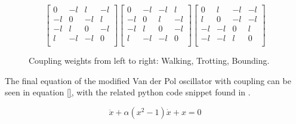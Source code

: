 \begin{figure}
\[
\begin{bmatrix}
0   & -l & l  & -l\\
-l   & 0 & -l  & l\\
-l   & l & 0  & -l\\
l   & -l & -l  & 0\\
\end{bmatrix}
\begin{bmatrix}
0   &  -l & -l  & l\\
-l   & 0 & l  &  -l\\
-l   & l & 0  & -l\\
l   & -l & -l  & 0\\
\end{bmatrix}
\begin{bmatrix}
0   & l & -l  & -l\\
l  & 0 & -l & -l\\
-l   & -l & 0  & l\\
-l  & -l & l  & 0\\
\end{bmatrix}
\]
\caption{Coupling weights from left to right: Walking, Trotting, Bounding.}
\end{figure}

The final equation  of the modified Van der Pol oscillator with coupling can be seen in equation \ref{}, with the related python code snippet found in \cite{}. 

\begin{equation}
\ddot{x} + \alpha(x^2 - 1)\dot{x} + x = 0
\label{vanderpol:pure}
\end{equation}

